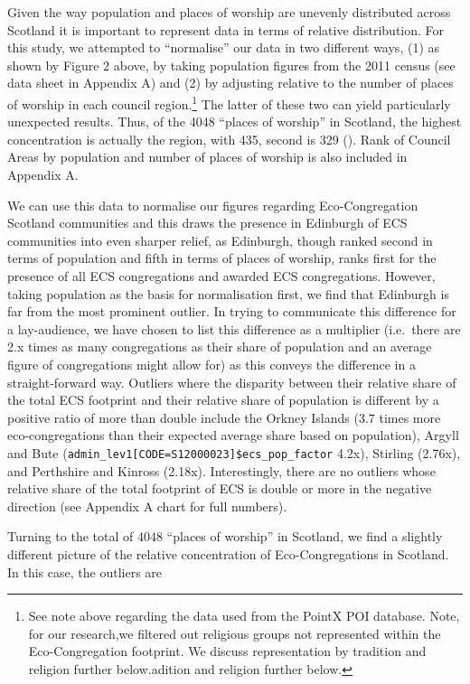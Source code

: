 \documentclass[11pt,]{article}
\let\rmarkdownfootnote\footnote%
\def\footnote{\protect\rmarkdownfootnote}
\begin{document}
Given the way population and places of worship are unevenly distributed
across Scotland it is important to represent data in terms of relative
distribution. For this study, we attempted to ``normalise'' our data in
two different ways, (1) as shown by Figure 2 above, by taking population
figures from the 2011 census (see data sheet in Appendix A) and (2) by
adjusting relative to the number of places of worship in each council
region.\footnote{See note above regarding the data used from the PointX
  POI database. Note, for our research,we filtered out religious groups
  not represented within the Eco-Congregation footprint. We discuss
  representation by tradition and religion further below.adition and
  religion further below.} The latter of these two can yield
particularly unexpected results. Thus, of the 4048 ``places of worship''
in Scotland, the highest concentration is actually the region, with 435,
second is 329 (). Rank of Council Areas by population and number of
places of worship is also included in Appendix A.

We can use this data to normalise our figures regarding Eco-Congregation
Scotland communities and this draws the presence in Edinburgh of ECS
communities into even sharper relief, as Edinburgh, though ranked second
in terms of population and fifth in terms of places of worship, ranks
first for the presence of all ECS congregations and awarded ECS
congregations. However, taking population as the basis for normalisation
first, we find that Edinburgh is far from the most prominent outlier. In
trying to communicate this difference for a lay-audience, we have chosen
to list this difference as a multiplier (i.e.~there are 2.x times as
many congregations as their share of population and an average figure of
congregations might allow for) as this conveys the difference in a
straight-forward way. Outliers where the disparity between their
relative share of the total ECS footprint and their relative share of
population is different by a positive ratio of more than double include
the Orkney Islands (3.7 times more eco-congregations than their expected
average share based on population), Argyll and Bute
(\texttt{admin\_lev1{[}CODE=S12000023{]}\$ecs\_pop\_factor} 4.2x),
Stirling (2.76x), and Perthshire and Kinross (2.18x). Interestingly,
there are no outliers whose relative share of the total footprint of ECS
is double or more in the negative direction (see Appendix A chart for
full numbers).

Turning to the total of 4048 ``places of worship'' in Scotland, we find
a slightly different picture of the relative concentration of
Eco-Congregations in Scotland. In this case, the outliers are
\end{document}
